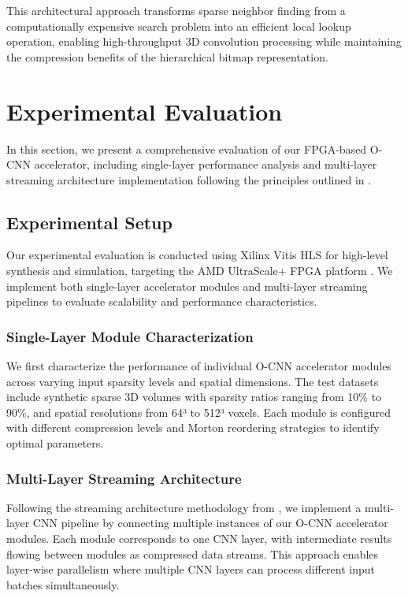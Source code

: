 \documentclass[sigconf, screen]{acmart}
\begin{document}
This architectural approach transforms sparse neighbor finding from a computationally expensive search problem into an efficient local lookup operation, enabling high-throughput 3D convolution processing while maintaining the compression benefits of the hierarchical bitmap representation.
\section{Experimental Evaluation}

In this section, we present a comprehensive evaluation of our FPGA-based O-CNN accelerator, including single-layer performance analysis and multi-layer streaming
architecture implementation following the principles outlined in \cite{rl2021}.

\subsection{Experimental Setup}

Our experimental evaluation is conducted using Xilinx Vitis HLS for high-level synthesis and simulation, targeting the AMD UltraScale+ FPGA platform
\cite{amddatasheet}. We implement both single-layer accelerator modules and multi-layer streaming pipelines to evaluate scalability and performance characteristics.

\subsubsection{Single-Layer Module Characterization}
We first characterize the performance of individual O-CNN accelerator modules across varying input sparsity levels and spatial dimensions. The test datasets include synthetic sparse 3D volumes with sparsity ratios ranging from 10\% to 90\%, and spatial resolutions from 64³ to 512³ voxels. Each module is configured with different compression levels and Morton reordering strategies to identify optimal parameters.

\subsubsection{Multi-Layer Streaming Architecture}
Following the streaming architecture methodology from \cite{rl2021}, we implement a multi-layer CNN pipeline by connecting multiple instances of our O-CNN accelerator modules. Each module corresponds to one CNN layer, with intermediate results flowing between modules as compressed data streams. This approach enables layer-wise parallelism where multiple CNN layers can process different input batches simultaneously.
\end{document}

